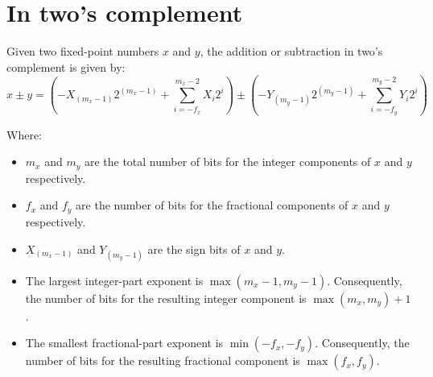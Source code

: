 \documentclass[12pt,openany]{book}
\begin{document}
			      	\newpage
			      	\section{In two's complement}
			      	Given two fixed-point numbers $x$ and $y$, the addition or subtraction in two's complement is given by:
			      	\begin{equation}
			      		x \pm y = \left( -X_{(m_x-1)}2^{(m_x-1)} + \sum_{i=-f_x}^{m_x-2} X_i2^i \right) \pm \left( -Y_{(m_y-1)}2^{(m_y-1)} + \sum_{i=-f_y}^{m_y-2} Y_i2^i \right)
			      	\end{equation}
			      	
			      	Where:
			      	\begin{itemize}
			      		\item[] $m_x$ and $m_y$ are the total number of bits for the integer components of $x$ and $y$ respectively.
			      		\item[] $f_x$ and $f_y$ are the number of bits for the fractional components of $x$ and $y$ respectively.
			      		\item[] $X_{(m_x-1)}$ and $Y_{(m_y-1)}$ are the sign bits of $x$ and $y$.
			      		\item[] The largest integer-part exponent is $\max(m_x - 1, m_y - 1)$. Consequently, the number of bits for the resulting integer component is $\max(m_x, m_y) + 1$.
			      		\item[] The smallest fractional-part exponent is $\min(-f_x, -f_y)$. Consequently, the number of bits for the resulting fractional component is $\max(f_x, f_y)$.
			      	\end{itemize}
			      	
			      	
\end{document}
